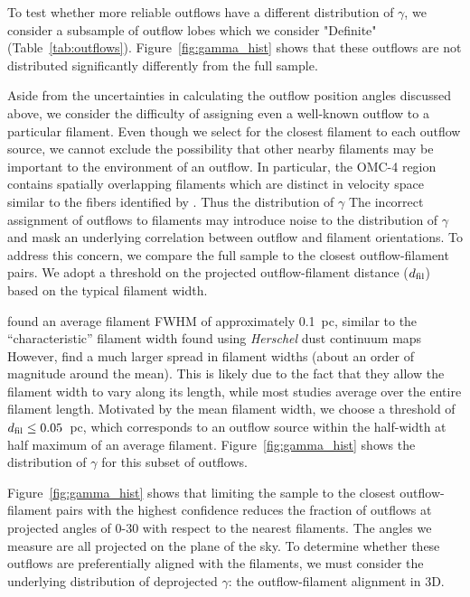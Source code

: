 \documentclass[twocolumn]{aastex63}
\begin{document}
To test whether more reliable outflows have a different distribution of $\gamma$, we consider a subsample of outflow lobes which we consider "Definite" (Table~\ref{tab:outflows}). Figure~\ref{fig:gamma_hist} shows that these outflows are not distributed significantly differently from the full sample.

Aside from the uncertainties in calculating the outflow position angles discussed above, we consider the difficulty of assigning even a well-known outflow to a particular filament. Even though we select for the closest filament to each outflow source, we cannot exclude the possibility that other nearby filaments may be important to the environment of an outflow. In particular, the OMC-4 region contains spatially overlapping filaments which are distinct in velocity space \citep{Suri19} similar to the fibers identified by \citet{Hacar13}. Thus the distribution of $\gamma$ The incorrect assignment of outflows to filaments may introduce noise to the distribution of $\gamma$ and mask an underlying correlation between outflow and filament orientations. To address this concern, we compare the full sample to the closest outflow-filament pairs. We adopt a threshold on the projected outflow-filament distance ($d_{\rm fil}$) based on the typical filament width.

\citet{Suri19} found an average filament FWHM of approximately 0.1~pc, similar to the ``characteristic'' filament width found using \emph{Herschel} dust continuum maps \citep[e.g.][]{Arzoumanian11,Koch15} However, \citet{Suri19} find a much larger spread in filament widths (about an order of magnitude around the mean). This is likely due to the fact that they allow the filament width to vary along its length, while most studies average over the entire filament length. Motivated by the mean filament width, we choose a threshold of $d_{\rm fil} \leq 0.05$~pc, which corresponds to an outflow source within the half-width at half maximum of an average filament. Figure~\ref{fig:gamma_hist} shows the distribution of $\gamma$ for this subset of outflows.

Figure~\ref{fig:gamma_hist} shows that limiting the sample to the closest outflow-filament pairs with the highest confidence reduces the fraction of outflows at projected angles of 0-30\degr{} with respect to the nearest filaments. The angles we measure are all projected on the plane of the sky. To determine whether these outflows are preferentially aligned with the filaments, we must consider the underlying distribution of deprojected $\gamma$: the outflow-filament alignment in 3D.
\end{document}
